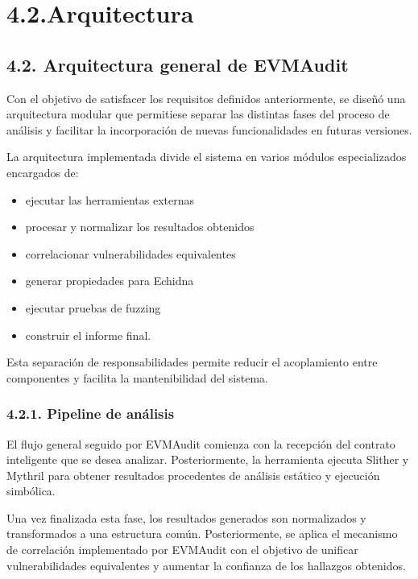 \section{4.2.Arquitectura}\label{arquitectura}

\subsection{4.2. Arquitectura general de
EVMAudit}\label{arquitectura-general-de-evmaudit}

Con el objetivo de satisfacer los requisitos definidos anteriormente, se
diseñó una arquitectura modular que permitiese separar las distintas
fases del proceso de análisis y facilitar la incorporación de nuevas
funcionalidades en futuras versiones.

La arquitectura implementada divide el sistema en varios módulos
especializados encargados de:

\begin{itemize}
\tightlist
\item
  ejecutar las herramientas externas
\item
  procesar y normalizar los resultados obtenidos
\item
  correlacionar vulnerabilidades equivalentes
\item
  generar propiedades para Echidna
\item
  ejecutar pruebas de fuzzing
\item
  construir el informe final.
\end{itemize}

Esta separación de responsabilidades permite reducir el acoplamiento
entre componentes y facilita la mantenibilidad del sistema.

\subsubsection{4.2.1. Pipeline de
análisis}\label{pipeline-de-anuxe1lisis}

El flujo general seguido por EVMAudit comienza con la recepción del
contrato inteligente que se desea analizar. Posteriormente, la
herramienta ejecuta Slither y Mythril para obtener resultados
procedentes de análisis estático y ejecución simbólica.

Una vez finalizada esta fase, los resultados generados son normalizados
y transformados a una estructura común. Posteriormente, se aplica el
mecanismo de correlación implementado por EVMAudit con el objetivo de
unificar vulnerabilidades equivalentes y aumentar la confianza de los
hallazgos obtenidos.

